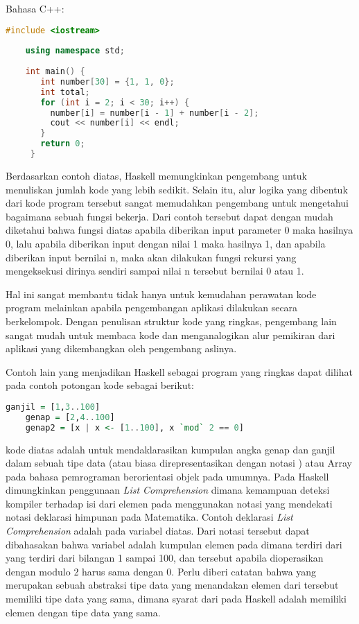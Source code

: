 \documentclass[pi.tex]{subfile}
\begin{document}
  \hspace{10pt}Bahasa C++:\\
  \begin{lstlisting}[language=C++]
    #include <iostream>  
  
    using namespace std;  
  
    int main() {  
       int number[30] = {1, 1, 0};  
       int total;  
       for (int i = 2; i < 30; i++) {  
         number[i] = number[i - 1] + number[i - 2];  
         cout << number[i] << endl;  
       }  
       return 0;  
     }  
  \end{lstlisting}

 \hspace{10pt} Berdasarkan contoh diatas, Haskell memungkinkan pengembang untuk menuliskan jumlah kode yang lebih sedikit. Selain itu, alur logika yang dibentuk dari kode program tersebut sangat memudahkan pengembang untuk mengetahui bagaimana sebuah fungsi bekerja. Dari contoh tersebut dapat dengan mudah diketahui bahwa fungsi  diatas apabila diberikan input parameter 0 maka hasilnya 0, lalu apabila diberikan input dengan nilai 1 maka hasilnya 1, dan apabila diberikan input bernilai n, maka akan dilakukan fungsi rekursi yang mengeksekusi dirinya sendiri sampai nilai n tersebut bernilai 0 atau 1.

  \hspace{10pt}Hal ini sangat membantu tidak hanya untuk kemudahan perawatan kode program melainkan apabila pengembangan aplikasi dilakukan secara berkelompok. Dengan penulisan struktur kode yang ringkas, pengembang lain sangat mudah untuk membaca kode dan menganalogikan alur pemikiran dari aplikasi yang dikembangkan oleh pengembang aslinya.

  \hspace{10pt}Contoh lain yang menjadikan Haskell sebagai program yang ringkas dapat dilihat pada contoh potongan kode sebagai berikut:\\
  \begin{lstlisting}[language=Haskell]
    ganjil = [1,3..100]
    genap = [2,4..100]
    genap2 = [x | x <- [1..100], x `mod` 2 == 0]
  \end{lstlisting}
  kode diatas adalah untuk mendaklarasikan kumpulan angka genap dan ganjil dalam sebuah tipe data  (atau biasa direpresentasikan dengan notasi \fhaskell{[ ]}) atau Array pada bahasa pemrograman berorientasi objek pada umumnya. Pada Haskell dimungkinkan penggunaan \emph{List Comprehension} dimana kemampuan deteksi kompiler terhadap isi dari elemen pada  menggunakan notasi yang mendekati notasi deklarasi himpunan pada Matematika. Contoh deklarasi \emph{List Comprehension} adalah pada variabel  diatas. Dari notasi tersebut dapat dibahasakan bahwa variabel  adalah kumpulan elemen pada  dimana terdiri dari  yang terdiri dari bilangan 1 sampai 100, dan  tersebut apabila dioperasikan dengan modulo 2 harus sama dengan 0. Perlu diberi catatan bahwa  yang merupakan sebuah abstraksi tipe data yang menandakan elemen dari  tersebut memiliki tipe data yang sama, dimana syarat dari  pada Haskell adalah memiliki elemen dengan tipe data yang sama.
\end{document}
